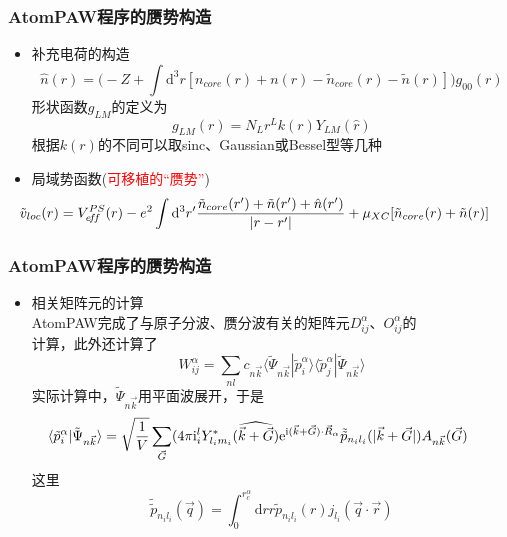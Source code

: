 \documentclass[cjk,slidestop,compress,mathserif,blue]{beamer}
\begin{document}
\frame
{
	\frametitle{\textrm{AtomPAW}程序的赝势构造}
	\begin{itemize}
		\item 补充电荷的构造
			$$\hat n(r)=\bigg(-Z+\int\mathrm{d}^3r[n_{core}(r)+n(r)-\tilde n_{core}(r)-\tilde n(r)]\bigg)g_{00}(r)$$
			形状函数$g_{LM}$的定义为$$g_{LM}(r)=N_Lr^Lk(r)Y_{LM}(\hat r)$$
			根据$k(r)$的不同可以取\textrm{sinc}、\textrm{Gaussian}或\textrm{Bessel}型等几种
		\item 局域势函数(\textcolor{red}{可移植的“赝势”})
			{\fontsize{9.5pt}{5.2pt}\selectfont$$\hspace*{-25pt}\tilde v_{loc}(r)=V_{e\!f\!f}^{PS}(r)-e^2\int\mathrm{d}^3r^{\prime}\dfrac{\tilde n_{core}(r^{\prime})+\tilde n(r^{\prime})+\hat n(r^{\prime})}{|r-r^{\prime}|}+\mu_{XC}[\tilde n_{core}(r)+\tilde n(r)]$$}
	\end{itemize}
}

\frame
{
	\frametitle{\textrm{AtomPAW}程序的赝势构造}
	\begin{itemize}
		\item 相关矩阵元的计算\\
			\textrm{AtomPAW}完成了与原子分波、赝分波有关的矩阵元$D_{ij}^{\alpha}$、$O_{ij}^{\alpha}$的\\计算，此外还计算了
			$$W_{ij}^{\alpha}=\sum_{nl}c_{n\vec k}\langle\tilde\Psi_{n\vec k}|\tilde p_i^\alpha\rangle\langle\tilde p_j^{\alpha}|\tilde\Psi_{n\vec k}\rangle$$
			实际计算中，$\tilde\Psi_{n\vec k}$用平面波展开，于是
			$$\hspace*{-20pt}\langle\tilde p_i^{\alpha}|\tilde\Psi_{n\vec k}\rangle=\sqrt{\dfrac1V}\sum_{\vec G}(4\pi \mathrm{i}^l_iY^{\ast}_{l_im_i}(\widehat{\vec k+\vec G})\mathrm{e}^{\mathrm{i}(\vec k+\vec G)\cdot\vec R_{\alpha}}\tilde{\tilde p}_{n_il_i}(|\vec k+\vec G|)A_{n\vec k}(\vec G)$$
			这里$$\tilde{\tilde p}_{n_il_i}(\vec q)=\int_0^{r_c^{\alpha}}\mathrm{d}rr\tilde p_{n_il_i}(r)j_{l_i}(\vec q\cdot\vec r)$$
	\end{itemize}
}
\end{document}

